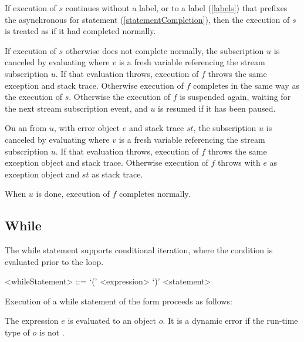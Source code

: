 \documentclass[makeidx]{article}
\begin{document}
\LMHash{}%
If execution of $s$ continues without a label,
or to a label (\ref{labels})
that prefixes the asynchronous for statement (\ref{statementCompletion}),
then the execution of $s$ is treated as if it had completed normally.

\LMHash{}%
If execution of $s$ otherwise does not complete normally,
the subscription $u$ is canceled by evaluating 
where $v$ is a fresh variable referencing the stream subscription $u$.
If that evaluation throws,
execution of $f$ throws the same exception and stack trace.
Otherwise execution of $f$ completes in the same way as the execution of $s$.
Otherwise the execution of $f$ is suspended again, waiting for
the next stream subscription event,
and $u$ is resumed if it has been paused.

\LMHash{}%
On an  from $u$,
with error object $e$ and stack trace $st$,
the subscription $u$ is canceled by evaluating 
where $v$ is a fresh variable referencing the stream subscription $u$.
If that evaluation throws,
execution of $f$ throws the same exception object and stack trace.
Otherwise execution of $f$ throws
with $e$ as exception object and $st$ as stack trace.

\LMHash{}%
When $u$ is done, execution of $f$ completes normally.


\subsection{While}

\LMHash{}%
The while statement supports conditional iteration,
where the condition is evaluated prior to the loop.

\begin{grammar}
<whileStatement> ::= \WHILE{} `(' <expression> `)' <statement>
\end{grammar}

\LMHash{}%
Execution of a while statement of the form 
proceeds as follows:

\LMHash{}%
The expression $e$ is evaluated to an object $o$.
It is a dynamic error if the run-time type of $o$ is not .
\end{document}
